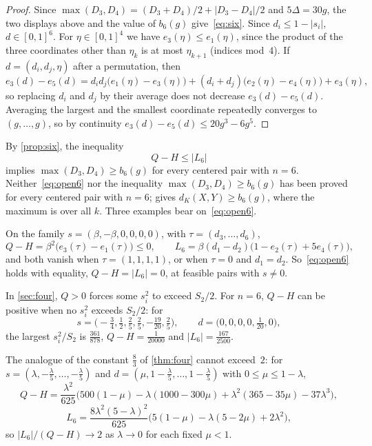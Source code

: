 \documentclass[11pt,a4paper]{article}
\numberwithin{equation}{section}
\theoremstyle{remark}
\begin{document}
\begin{proof}
Since $\max(D_3,D_4)=(D_3+D_4)/2+|D_3-D_4|/2$ and $5\Delta=30g$, the two displays above and the value of $b_6(g)$ give~\eqref{eq:six}. Since $d_i\le1-|s_i|$, $d\in[0,1]^6$. For $\eta\in[0,1]^4$ we have $e_3(\eta)\le e_1(\eta)$, since the product of the three coordinates other than $\eta_k$ is at most $\eta_{k+1}$ (indices mod~$4$). If $d=(d_i,d_j,\eta)$ after a permutation, then
\[
e_3(d)-e_5(d)=d_id_j\bigl(e_1(\eta)-e_3(\eta)\bigr)+(d_i+d_j)\bigl(e_2(\eta)-e_4(\eta)\bigr)+e_3(\eta),
\]
so replacing $d_i$ and $d_j$ by their average does not decrease $e_3(d)-e_5(d)$. Averaging the largest and the smallest coordinate repeatedly converges to $(g,\dots,g)$, so by continuity $e_3(d)-e_5(d)\le20g^3-6g^5$.
\end{proof}

By \cref{prop:six}, the inequality
\begin{equation}\label{eq:open6}
Q-H\le|L_6|
\end{equation}
implies $\max(D_3,D_4)\ge b_6(g)$ for every centered pair with $n=6$. Neither~\eqref{eq:open6} nor the inequality $\max(D_3,D_4)\ge b_6(g)$ has been proved for every centered pair with $n=6$; \cite[Theorem~1.1]{Long} gives $d_K(X,Y)\ge b_6(g)$, where the maximum is over all $k$. Three examples bear on~\eqref{eq:open6}.

On the family $s=(\beta,-\beta,0,0,0,0)$, with $\tau=(d_3,\dots,d_6)$,
\[
Q-H=\beta^2\bigl(e_3(\tau)-e_1(\tau)\bigr)\le0,\qquad L_6=\beta(d_1-d_2)\bigl(1-e_2(\tau)+5e_4(\tau)\bigr),
\]
and both vanish when $\tau=(1,1,1,1)$, or when $\tau=0$ and $d_1=d_2$. So~\eqref{eq:open6} holds with equality, $Q-H=|L_6|=0$, at feasible pairs with $s\ne0$.

In \cref{sec:four}, $Q>0$ forces some $s_i^2$ to exceed $S_2/2$. For $n=6$, $Q-H$ can be positive when no $s_i^2$ exceeds $S_2/2$: for
\[
s=\bigl(-\tfrac34,\tfrac12,\tfrac25,\tfrac25,-\tfrac{19}{20},\tfrac25\bigr),\qquad d=\bigl(0,0,0,0,\tfrac1{20},0\bigr),
\]
the largest $s_i^2/S_2$ is $\frac{361}{878}$, $Q-H=\frac1{20000}$ and $|L_6|=\frac{167}{2500}$.

The analogue of the constant $\frac83$ of \cref{thm:four} cannot exceed~$2$: for $s=(\lambda,-\frac\lambda5,\dots,-\frac\lambda5)$ and $d=(\mu,1-\frac\lambda5,\dots,1-\frac\lambda5)$ with $0\le\mu\le1-\lambda$,
\[
Q-H=\frac{\lambda^2}{625}\bigl(500(1-\mu)-\lambda(1000-300\mu)+\lambda^2(365-35\mu)-37\lambda^3\bigr),
\]
\[
L_6=\frac{8\lambda^2(5-\lambda)^2}{625}\bigl(5(1-\mu)-\lambda(5-2\mu)+2\lambda^2\bigr),
\]
so $|L_6|/(Q-H)\to2$ as $\lambda\to0$ for each fixed $\mu<1$.
\end{document}

